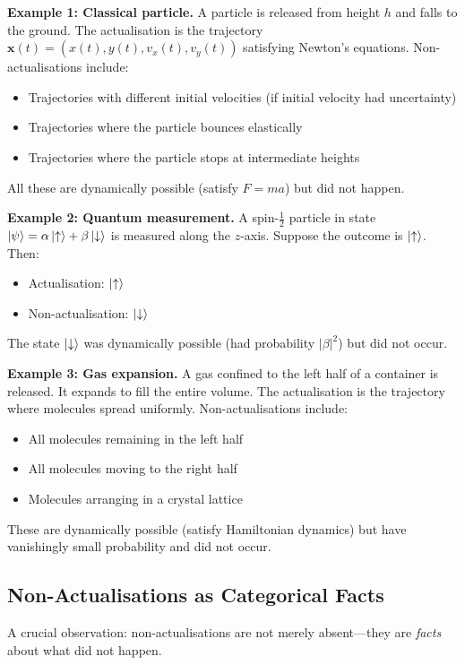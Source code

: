 \documentclass[twocolumn,10pt]{article}
\theoremstyle{definition}
\theoremstyle{remark}
\begin{document}
\textbf{Example 1: Classical particle.} A particle is released from height $h$ and falls to the ground. The actualisation is the trajectory $\mathbf{x}(t) = (x(t), y(t), v_x(t), v_y(t))$ satisfying Newton's equations. Non-actualisations include:
\begin{itemize}
\item Trajectories with different initial velocities (if initial velocity had uncertainty)
\item Trajectories where the particle bounces elastically
\item Trajectories where the particle stops at intermediate heights
\end{itemize}

All these are dynamically possible (satisfy $F = ma$) but did not happen.

\textbf{Example 2: Quantum measurement.} A spin-$\frac{1}{2}$ particle in state $\ket{\psi} = \alpha\ket{\uparrow} + \beta\ket{\downarrow}$ is measured along the $z$-axis. Suppose the outcome is $\ket{\uparrow}$. Then:
\begin{itemize}
\item Actualisation: $\ket{\uparrow}$
\item Non-actualisation: $\ket{\downarrow}$
\end{itemize}

The state $\ket{\downarrow}$ was dynamically possible (had probability $|\beta|^2$) but did not occur.

\textbf{Example 3: Gas expansion.} A gas confined to the left half of a container is released. It expands to fill the entire volume. The actualisation is the trajectory where molecules spread uniformly. Non-actualisations include:
\begin{itemize}
\item All molecules remaining in the left half
\item All molecules moving to the right half
\item Molecules arranging in a crystal lattice
\end{itemize}

These are dynamically possible (satisfy Hamiltonian dynamics) but have vanishingly small probability and did not occur.

\subsection{Non-Actualisations as Categorical Facts}

A crucial observation: non-actualisations are not merely absent—they are \textit{facts} about what did not happen.
\end{document}
